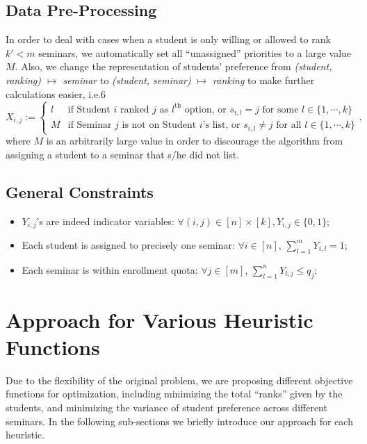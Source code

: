 \documentclass{article} %
\begin{document}
\subsection{Data Pre-Processing}
    \par\qquad In order to deal with cases when a student is only willing or allowed to rank $k'<m$ seminars, we automatically set all ``unassigned'' priorities to a large value $\textit{M}$. Also, we change the representation of students' preference from \emph{(student, ranking) $\mapsto$ seminar} to \emph{(student, seminar) $\mapsto$ ranking} to make further calculations easier, i.e.6
        $$X_{i,j}:=\begin{cases}
                     l &\text{if Student $i$ ranked $j$ as $l^{\text{th}}$ option, or $s_{i,l}=j$ for some $l\in\{1,\cdots,k\}$}\\
                     \textit{M}         &\text{if Seminar $j$ is not on Student $i$'s list, or $s_{i,l} \neq j$ for all $l\in\{1,\cdots,k\}$}
                   \end{cases},$$
    where $\textit{M}$ is an arbitrarily large value in order to discourage the algorithm from assigning a student to a seminar that s/he did not list.

\subsection{General Constraints}
    \begin{itemize}
    \item $Y_{i,j}$'s are indeed indicator variables: $\forall (i,j)\in[n]\times[k], Y_{i,j}\in\{0,1\}$;
    \item Each student is assigned to precisely one seminar: $\forall i\in[n]$, $\sum_{l=1}^{m}{Y_{i,l}}=1$;
    \item Each seminar is within enrollment quota: $\forall j\in[m]$, $\sum_{l=1}^{n}{Y_{l,j}} \leq q_j$;
\end{itemize}

%
%
\section{Approach for Various Heuristic Functions}
    \par\qquad Due to the flexibility of the original problem, we are proposing different objective functions for optimization, including minimizing the total ``ranks'' given by the students, and minimizing the variance of student preference across different seminars. In the following sub-sections we briefly introduce our approach for each heuristic.
\end{document}
